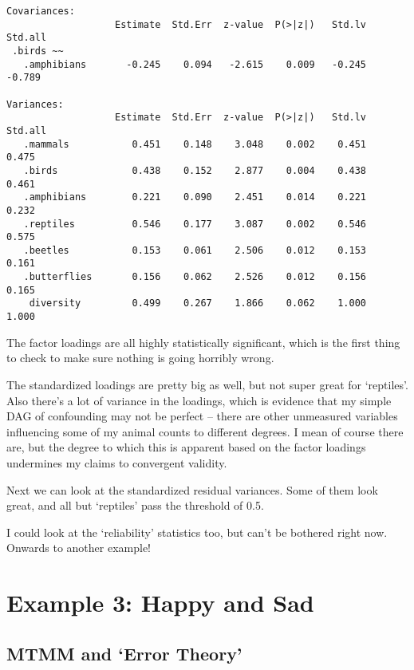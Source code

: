 \documentclass[
  letterpaper,
  DIV=11,
  numbers=noendperiod]{scrreprt}
\begin{document}
\begin{verbatim}
Covariances:
                   Estimate  Std.Err  z-value  P(>|z|)   Std.lv  Std.all
 .birds ~~                                                              
   .amphibians       -0.245    0.094   -2.615    0.009   -0.245   -0.789

Variances:
                   Estimate  Std.Err  z-value  P(>|z|)   Std.lv  Std.all
   .mammals           0.451    0.148    3.048    0.002    0.451    0.475
   .birds             0.438    0.152    2.877    0.004    0.438    0.461
   .amphibians        0.221    0.090    2.451    0.014    0.221    0.232
   .reptiles          0.546    0.177    3.087    0.002    0.546    0.575
   .beetles           0.153    0.061    2.506    0.012    0.153    0.161
   .butterflies       0.156    0.062    2.526    0.012    0.156    0.165
    diversity         0.499    0.267    1.866    0.062    1.000    1.000
\end{verbatim}

The factor loadings are all highly statistically significant, which is
the first thing to check to make sure nothing is going horribly wrong.

The standardized loadings are pretty big as well, but not super great
for `reptiles'. Also there's a lot of variance in the loadings, which is
evidence that my simple DAG of confounding may not be perfect -- there
are other unmeasured variables influencing some of my animal counts to
different degrees. I mean of course there are, but the degree to which
this is apparent based on the factor loadings undermines my claims to
convergent validity.

Next we can look at the standardized residual variances. Some of them
look great, and all but `reptiles' pass the threshold of 0.5.

I could look at the `reliability' statistics too, but can't be bothered
right now. Onwards to another example!

\hypertarget{example-3-happy-and-sad}{%
\section*{Example 3: Happy and Sad}\label{example-3-happy-and-sad}}


\hypertarget{mtmm-and-error-theory}{%
\subsection*{MTMM and `Error Theory'}\label{mtmm-and-error-theory}}
\end{document}
